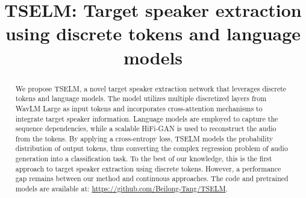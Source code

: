 \documentclass[conference]{IEEEtran}
\begin{document}
\title{TSELM: Target speaker extraction using discrete tokens and language models
}

\author{
\and
{}
\and
{}
}

\maketitle

\begin{abstract}
  We propose TSELM, a novel target speaker extraction network that leverages discrete tokens and language models. The model utilizes multiple discretized layers from WavLM Large as input tokens and incorporates cross-attention mechanisms to integrate target speaker information. Language models are employed to capture the sequence dependencies, while a scalable HiFi-GAN is used to reconstruct the audio from the tokens. By applying a cross-entropy loss, TSELM models the probability distribution of output tokens, thus converting the complex regression problem of audio generation into a classification task. To the best of our knowledge, this is the first approach to target speaker extraction using discrete tokens. However, a performance gap remains between our method and continuous approaches. The code and pretrained models are available at: \href{https://github.com/Beilong-Tang/TSELM}{https://github.com/Beilong-Tang/TSELM}.
\end{abstract}
\end{document}
